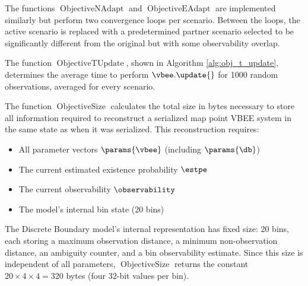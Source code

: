 The functions $\operatorname{ObjectiveNAdapt}$ and $\operatorname{ObjectiveEAdapt}$ are implemented similarly but perform two convergence loops per scenario. Between the loops, the active scenario is replaced with a predetermined partner scenario selected to be significantly different from the original but with some observability overlap.

The function $\operatorname{ObjectiveTUpdate}$, shown in Algorithm \ref{alg:obj_t_update}, determines the average time to perform $\vbee.\update{}$ for 1000 random observations, averaged for every scenario.

\begin{singlespace}
    \begin{algorithm}[H]
        \caption[Objective Function: $t_{update}$]{ObjectiveTUpdate}
        \label{alg:obj_t_update}
        \begin{algorithmic}
                \EndFor
            \EndFor
            \EndFunction
        \end{algorithmic}
    \end{algorithm}
\end{singlespace}

The function $\operatorname{ObjectiveSize}$ calculates the total size in bytes necessary to store all information required to reconstruct a serialized map point VBEE system in the same state as when it was serialized. This reconstruction requires:
\begin{itemize}
    \item All parameter vectors $\params{\vbee}$ (including $\params{\db}$)
    \item The current estimated existence probability $\estpe$
    \item The current observability $\observability$
    \item The model's internal bin state (20 bins)
\end{itemize}
The Discrete Boundary model's internal representation has fixed size: 20 bins, each storing a maximum observation distance, a minimum non-observation distance, an ambiguity counter, and a bin observability estimate. Since this size is independent of all parameters, $\operatorname{ObjectiveSize}$ returns the constant $20 \times 4 \times 4 = 320$ bytes (four 32-bit values per bin).

